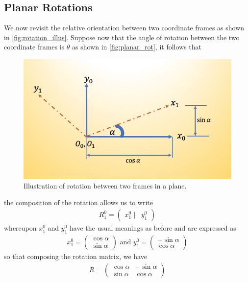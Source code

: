 \subsection{Planar Rotations}
%
We now revisit the relative orientation between two coordinate frames as shown in \autoref{fig:rotation_illus}. Suppose now that the angle of rotation between the two coordinate frames is $\theta$ as shown in \autoref{fig:planar_rot}, it follows that 
%
\begin{figure}[tb!]
	\centering
	\includegraphics[width=.75\columnwidth]{figures/planar_rot.png}
	\caption{Illustration of rotation between two frames in a plane.}
	\label{fig:planar_rot}
\end{figure}
%
the composition of the rotation allows us to write 
%
\begin{align}
R_1^0 = \left(\begin{array}{cc}
x_1^0 \,\,| & y_1^0
\end{array}\right)
\end{align}
%
whereupon $x_1^0$ and $y_1^0$ have the usual meanings as before and are expressed as 
%
\begin{align}
x_1^0 = \left(\begin{array}{cc}
\cos \alpha \\ \sin \alpha
\end{array}\right) \text{ and }
%
y_1^0 = \left(\begin{array}{cc}
-\sin \alpha \\ \cos \alpha
\end{array}\right)
\end{align}
%
so that composing the rotation matrix, we have
%
\begin{align}
R = \left(\begin{array}{cc}
\cos \alpha & -\sin \alpha \\ \sin \alpha &  \cos \alpha
\end{array}\right)
\end{align}
